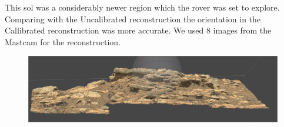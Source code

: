 This sol was a considerably newer region which the rover was set to explore. Comparing with the Uncalibrated reconstruction the orientation in the Callibrated reconstruction was more accurate. We used 8 images from the Mastcam for the reconstruction. 


\begin{figure}[H]
	\centering
	\includegraphics[scale=0.3]{img/sol283calib.png}
	\label{fig:sol283calib}
	\caption{}
\end{figure}
